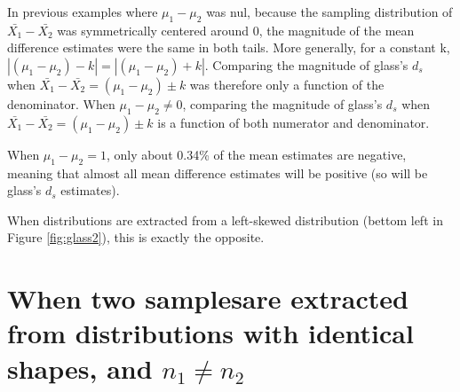 \documentclass[
  man,floatsintext]{apa6}
\begin{document}
In previous examples where \(\mu_1-\mu_2\) was nul, because the sampling distribution of \(\bar{X_1}-\bar{X_2}\) was symmetrically centered around 0, the magnitude of the mean difference estimates were the same in both tails. More generally, for a constant k, \(|(\mu_1-\mu_2)-k|=|(\mu_1-\mu_2)+k|\). Comparing the magnitude of glass's \(d_s\) when \(\bar{X_1}-\bar{X_2} = (\mu_1-\mu_2) \pm k\) was therefore only a function of the denominator. When \(\mu_1-\mu_2 \neq 0\), comparing the magnitude of glass's \(d_s\) when \(\bar{X_1}-\bar{X_2} = (\mu_1-\mu_2) \pm k\) is a function of both numerator and denominator.

When \(\mu_1-\mu_2=1\), only about 0.34\% of the mean estimates are negative, meaning that almost all mean difference estimates will be positive (so will be glass's \(d_s\) estimates).

When distributions are extracted from a left-skewed distribution (bettom left in Figure \ref{fig:glass2}), this is exactly the opposite.

\hypertarget{when-two-samplesare-extracted-from-distributions-with-identical-shapes-and-n_1-neq-n_2}{%
\section{\texorpdfstring{When two samplesare extracted from distributions with identical shapes, and \(n_1 \neq n_2\)}{When two samplesare extracted from distributions with identical shapes, and n\_1 \textbackslash neq n\_2}}\label{when-two-samplesare-extracted-from-distributions-with-identical-shapes-and-n_1-neq-n_2}}
\end{document}
